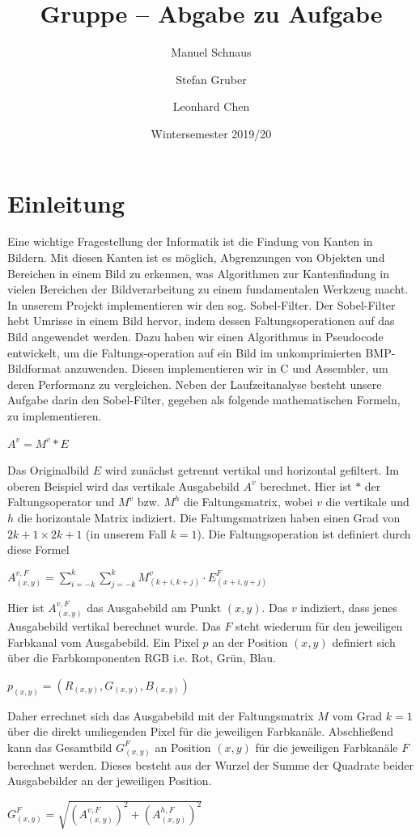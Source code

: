 \documentclass[course=asp]{aspdoc}
\author{Manuel Schnaus \and Stefan Gruber \and Leonhard Chen}
\date{Wintersemester 2019/20} %
\title{Gruppe \theGroup{} -- Abgabe zu Aufgabe \theNumber}
\begin{document}
\maketitle

\section{Einleitung}
Eine wichtige Fragestellung der Informatik ist die Findung von Kanten in Bildern. Mit diesen Kanten ist es möglich, Abgrenzungen von Objekten und Bereichen in einem Bild zu erkennen, was Algorithmen zur Kantenfindung in vielen Bereichen der Bildverarbeitung zu einem fundamentalen Werkzeug macht. In unserem Projekt implementieren wir den sog. Sobel-Filter. Der Sobel-Filter hebt Umrisse in einem Bild hervor, indem dessen Faltungsoperationen auf das Bild angewendet werden. Dazu haben wir einen Algorithmus in Pseudocode entwickelt, um die Faltungs-operation auf ein Bild im unkomprimierten BMP-Bildformat anzuwenden. Diesen implementieren wir in C und Assembler, um deren Performanz zu vergleichen. Neben der Laufzeitanalyse besteht unsere Aufgabe darin den Sobel-Filter, gegeben als folgende mathematischen Formeln, zu implementieren.
\begin{center}
$A^{v}=M^{v}\ast E$
\end{center}
Das Originalbild $E$ wird zunächst getrennt vertikal und horizontal gefiltert. Im oberen Beispiel wird das vertikale Ausgabebild $A^{v}$ berechnet. Hier ist $\ast$ der Faltungsoperator und $M^{v}$ bzw. $M^{h}$ die Faltungsmatrix, wobei $v$ die vertikale und $h$ die horizontale Matrix indiziert. Die Faltungsmatrizen haben einen Grad von $2k+1\times 2k+1$ (in unserem Fall $k=1$). Die Faltungsoperation ist definiert durch diese Formel
\begin{center}
$A_{(x,y)}^{v,F}=\displaystyle\sum_{i=-k}^{k}\displaystyle\sum_{j=-k}^{k}M_{(k+i,k+j)}^{v}\cdot E_{(x+i,y+j)}^{F}$
\end{center}
Hier ist $A_{(x,y)}^{v,F}$ das Ausgabebild am Punkt $(x,y)$. Das $v$ indiziert, dass jenes Ausgabebild vertikal berechnet wurde. Das $F$ steht wiederum für den jeweiligen Farbkanal vom Ausgabebild. Ein Pixel $p$ an der Position $(x,y)$ definiert sich über die Farbkomponenten RGB i.e. Rot, Grün, Blau.
\begin{center}
$p_{(x,y)}=(R_{(x,y)},G_{(x,y)},B_{(x,y)})$
\end{center}
\newpage
Daher errechnet sich das Ausgabebild mit der Faltungsmatrix $M$ vom Grad $k=1$ über die direkt umliegenden Pixel für die jeweiligen Farbkanäle. Abschließend kann das Gesamtbild $G_{(x,y)}^{F}$ an Position $(x,y)$ für die jeweiligen Farbkanäle $F$ berechnet werden. Dieses besteht aus der Wurzel der Summe der Quadrate beider Ausgabebilder an der jeweiligen Position.
\begin{center}
$G_{(x,y)}^{F}=\sqrt{(A_{(x,y)}^{v,F})^{2}+(A_{(x,y)}^{h,F})^{2}}$
\end{center}
\end{document}
